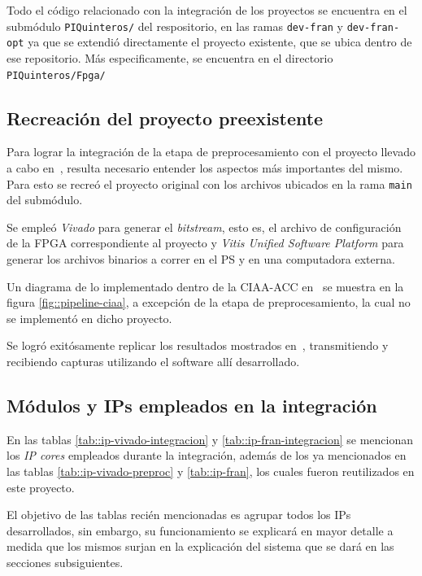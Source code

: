\documentclass[../../main.tex]{subfiles}
\begin{document}
Todo el código relacionado con la integración de los proyectos se encuentra en el submódulo \texttt{PIQuinteros/} del respositorio, en las ramas \texttt{dev-fran} y \texttt{dev-fran-opt} ya que se extendió directamente el proyecto existente, que se ubica dentro de ese repositorio. Más especificamente, se encuentra en el directorio \texttt{PIQuinteros/Fpga/}

\subsection{Recreación del proyecto preexistente}
Para lograr la integración de la etapa de preprocesamiento con el proyecto llevado a cabo en~\cite{proyecto-jose}, resulta necesario entender los aspectos más importantes del mismo. Para esto se recreó el proyecto original con los archivos ubicados en la rama \texttt{main} del submódulo.

Se empleó \textit{Vivado} para generar el \textit{bitstream}, esto es, el archivo de configuración de la FPGA correspondiente al proyecto y \textit{Vitis Unified Software Platform} para generar los archivos binarios a correr en el PS y en una computadora externa.

Un diagrama de lo implementado dentro de la CIAA-ACC en~\cite{proyecto-jose} se muestra en la figura \ref{fig::pipeline-ciaa}, a excepción de la etapa de preprocesamiento, la cual no se implementó en dicho proyecto.

Se logró exitósamente replicar los resultados mostrados en~\cite{proyecto-jose}, transmitiendo y recibiendo capturas utilizando el software allí desarrollado.

\subsection{Módulos y IPs empleados en la integración}
En las tablas \ref{tab::ip-vivado-integracion} y \ref{tab::ip-fran-integracion} se mencionan los \textit{IP cores} empleados durante la integración, además de los ya mencionados en las tablas \ref{tab::ip-vivado-preproc} y \ref{tab::ip-fran}, los cuales fueron reutilizados en este proyecto.

El objetivo de las tablas recién mencionadas es agrupar todos los IPs desarrollados, sin embargo, su funcionamiento se explicará en mayor detalle a medida que los mismos surjan en la explicación del sistema que se dará en las secciones subsiguientes.

\end{document}
